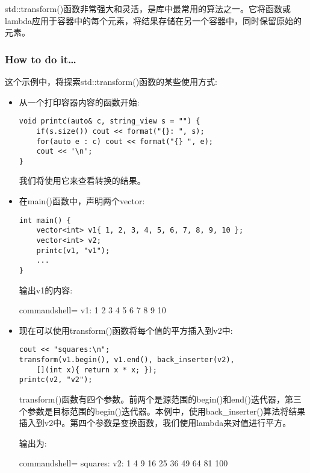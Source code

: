 
std::transform()函数非常强大和灵活，是库中最常用的算法之一。它将函数或lambda应用于容器中的每个元素，将结果存储在另一个容器中，同时保留原始的元素。

\subsubsection{How to do it…}

这个示例中，将探索std::transform()函数的某些使用方式:

\begin{itemize}
\item 
从一个打印容器内容的函数开始:

\begin{lstlisting}[style=styleCXX]
void printc(auto& c, string_view s = "") {
	if(s.size()) cout << format("{}: ", s);
	for(auto e : c) cout << format("{} ", e);
	cout << '\n';
}
\end{lstlisting}

我们将使用它来查看转换的结果。

\item 
在main()函数中，声明两个vector:

\begin{lstlisting}[style=styleCXX]
int main() {
	vector<int> v1{ 1, 2, 3, 4, 5, 6, 7, 8, 9, 10 };
	vector<int> v2;
	printc(v1, "v1");
	...
}
\end{lstlisting}

输出v1的内容:

\begin{tcblisting}{commandshell={}}
v1: 1 2 3 4 5 6 7 8 9 10
\end{tcblisting}

\item 
现在可以使用transform()函数将每个值的平方插入到v2中:

\begin{lstlisting}[style=styleCXX]
cout << "squares:\n";
transform(v1.begin(), v1.end(), back_inserter(v2),
	[](int x){ return x * x; });
printc(v2, "v2");
\end{lstlisting}

transform()函数有四个参数。前两个是源范围的begin()和end()迭代器，第三个参数是目标范围的begin()迭代器。本例中，使用back\_inserter()算法将结果插入到v2中。第四个参数是变换函数，我们使用lambda来对值进行平方。

输出为:

\begin{tcblisting}{commandshell={}}
squares:
v2: 1 4 9 16 25 36 49 64 81 100
\end{tcblisting}


\end{itemize}
